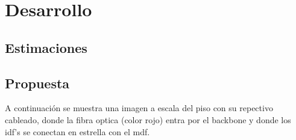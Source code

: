 \documentclass[letterpaper]{article}
\begin{document}
\newpage{}


\section{Desarrollo}\label{sec:ana}




\subsection{Estimaciones}\label{sec:sc}



\subsection{Propuesta}\label{sec:pro}



A continuación se muestra una imagen a escala del piso con
su repectivo cableado, donde la fibra optica (color rojo)
entra por el backbone y donde los  \acrshort{idf}'s se
conectan en estrella con el \acrshort{mdf}.


\label{page:plano}

\newpage{}

\printglossary[type=\acronymtype]

\printglossary{}

\newpage{}

\listoftables
\listoffigures
\end{document}
